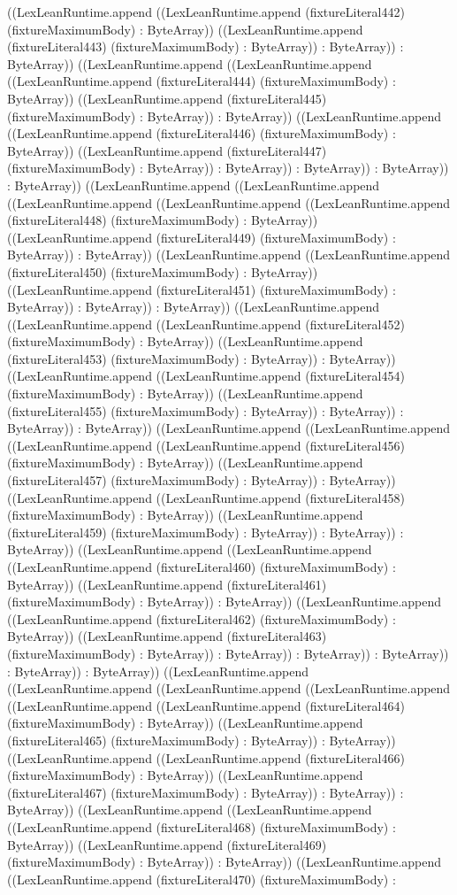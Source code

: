 \documentclass[11pt]{article}
\begin{document}
((LexLeanRuntime.append ((LexLeanRuntime.append (fixtureLiteral442) (fixtureMaximumBody) : ByteArray)) ((LexLeanRuntime.append (fixtureLiteral443) (fixtureMaximumBody) : ByteArray)) : ByteArray)) : ByteArray)) ((LexLeanRuntime.append ((LexLeanRuntime.append ((LexLeanRuntime.append (fixtureLiteral444) (fixtureMaximumBody) : ByteArray)) ((LexLeanRuntime.append (fixtureLiteral445) (fixtureMaximumBody) : ByteArray)) : ByteArray)) ((LexLeanRuntime.append ((LexLeanRuntime.append (fixtureLiteral446) (fixtureMaximumBody) : ByteArray)) ((LexLeanRuntime.append (fixtureLiteral447) (fixtureMaximumBody) : ByteArray)) : ByteArray)) : ByteArray)) : ByteArray)) : ByteArray)) ((LexLeanRuntime.append ((LexLeanRuntime.append ((LexLeanRuntime.append ((LexLeanRuntime.append ((LexLeanRuntime.append (fixtureLiteral448) (fixtureMaximumBody) : ByteArray)) ((LexLeanRuntime.append (fixtureLiteral449) (fixtureMaximumBody) : ByteArray)) : ByteArray)) ((LexLeanRuntime.append ((LexLeanRuntime.append (fixtureLiteral450) (fixtureMaximumBody) : ByteArray)) ((LexLeanRuntime.append (fixtureLiteral451) (fixtureMaximumBody) : ByteArray)) : ByteArray)) : ByteArray)) ((LexLeanRuntime.append ((LexLeanRuntime.append ((LexLeanRuntime.append (fixtureLiteral452) (fixtureMaximumBody) : ByteArray)) ((LexLeanRuntime.append (fixtureLiteral453) (fixtureMaximumBody) : ByteArray)) : ByteArray)) ((LexLeanRuntime.append ((LexLeanRuntime.append (fixtureLiteral454) (fixtureMaximumBody) : ByteArray)) ((LexLeanRuntime.append (fixtureLiteral455) (fixtureMaximumBody) : ByteArray)) : ByteArray)) : ByteArray)) : ByteArray)) ((LexLeanRuntime.append ((LexLeanRuntime.append ((LexLeanRuntime.append ((LexLeanRuntime.append (fixtureLiteral456) (fixtureMaximumBody) : ByteArray)) ((LexLeanRuntime.append (fixtureLiteral457) (fixtureMaximumBody) : ByteArray)) : ByteArray)) ((LexLeanRuntime.append ((LexLeanRuntime.append (fixtureLiteral458) (fixtureMaximumBody) : ByteArray)) ((LexLeanRuntime.append (fixtureLiteral459) (fixtureMaximumBody) : ByteArray)) : ByteArray)) : ByteArray)) ((LexLeanRuntime.append ((LexLeanRuntime.append ((LexLeanRuntime.append (fixtureLiteral460) (fixtureMaximumBody) : ByteArray)) ((LexLeanRuntime.append (fixtureLiteral461) (fixtureMaximumBody) : ByteArray)) : ByteArray)) ((LexLeanRuntime.append ((LexLeanRuntime.append (fixtureLiteral462) (fixtureMaximumBody) : ByteArray)) ((LexLeanRuntime.append (fixtureLiteral463) (fixtureMaximumBody) : ByteArray)) : ByteArray)) : ByteArray)) : ByteArray)) : ByteArray)) : ByteArray)) ((LexLeanRuntime.append ((LexLeanRuntime.append ((LexLeanRuntime.append ((LexLeanRuntime.append ((LexLeanRuntime.append ((LexLeanRuntime.append (fixtureLiteral464) (fixtureMaximumBody) : ByteArray)) ((LexLeanRuntime.append (fixtureLiteral465) (fixtureMaximumBody) : ByteArray)) : ByteArray)) ((LexLeanRuntime.append ((LexLeanRuntime.append (fixtureLiteral466) (fixtureMaximumBody) : ByteArray)) ((LexLeanRuntime.append (fixtureLiteral467) (fixtureMaximumBody) : ByteArray)) : ByteArray)) : ByteArray)) ((LexLeanRuntime.append ((LexLeanRuntime.append ((LexLeanRuntime.append (fixtureLiteral468) (fixtureMaximumBody) : ByteArray)) ((LexLeanRuntime.append (fixtureLiteral469) (fixtureMaximumBody) : ByteArray)) : ByteArray)) ((LexLeanRuntime.append ((LexLeanRuntime.append (fixtureLiteral470) (fixtureMaximumBody) : 
\end{document}

